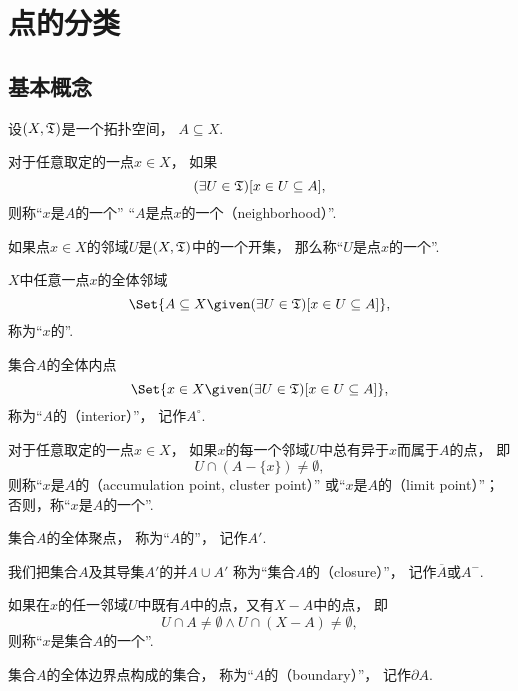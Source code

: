 \section{点的分类}
\subsection{基本概念}
\begin{definition}\label{definition:拓扑学.点的分类}
设\((X,\mathfrak T)\)是一个拓扑空间，
\(A \subseteq X\).

对于任意取定的一点\(x \in X\)，
如果\[
	(\exists U\in\mathfrak T)
	[x \in U \subseteq A],
\]
则称“\(x\)是\(A\)的一个”
“\(A\)是点\(x\)的一个（neighborhood）”.

如果点\(x \in X\)的邻域\(U\)是\((X,\mathfrak T)\)中的一个开集，
那么称“\(U\)是点\(x\)的一个”.

\(X\)中任意一点\(x\)的全体邻域\[
	\Set{
		A \subseteq X \given (\exists U\in\T)[x \in U \subseteq A]
	},
\]
称为“\(x\)的”.

集合\(A\)的全体内点\[
	\Set{
		x \in X \given (\exists U\in\T)[x \in U \subseteq A]
	},
\]
称为“\(A\)的（interior）”，
记作\(A^\circ\).

对于任意取定的一点\(x \in X\)，
如果\(x\)的每一个邻域\(U\)中总有异于\(x\)而属于\(A\)的点，
即\[
	U \cap (A - \{x\}) \neq \emptyset,
\]
则称“\(x\)是\(A\)的（accumulation point, cluster point）”
或“\(x\)是\(A\)的（limit point）”；
否则，称“\(x\)是\(A\)的一个”.

集合\(A\)的全体聚点，
称为“\(A\)的”，
记作\(A'\).

我们把集合\(A\)及其导集\(A'\)的并\(A \cup A'\)
称为“集合\(A\)的（closure）”，
记作\(\overline{A}\)或\(A^-\).

如果在\(x\)的任一邻域\(U\)中既有\(A\)中的点，又有\(X - A\)中的点，
即\[
	U \cap A \neq \emptyset
	\land
	U \cap (X-A) \neq \emptyset,
\]
则称“\(x\)是集合\(A\)的一个”.

集合\(A\)的全体边界点构成的集合，
称为“\(A\)的（boundary）”，
记作\(\partial A\).
\end{definition}

